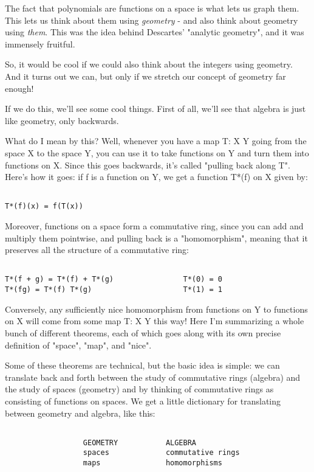 The fact that polynomials are functions on a space is what lets us 
graph them.  This lets us think about them using \emph{geometry} - and also 
think about geometry using \emph{them}.  This was the idea behind Descartes'
"analytic geometry", and it was immensely fruitful.

So, it would be cool if we could also think about the integers using 
geometry.  And it turns out we can, but only if we stretch our concept 
of geometry far enough!  

If we do this, we'll see some cool things.  First of all, we'll see 
that algebra is just like geometry, only backwards.  

What do I mean by this?  Well, whenever you have a map T: X \to  Y going 
from the space X to the space Y, you can use it to take functions on Y 
and turn them into functions on X.  Since this goes backwards, it's 
called "pulling back along T".  Here's how it goes: if f is a function 
on Y, we get a function T*(f) on X given by:


\begin{verbatim}

T*(f)(x) = f(T(x))
\end{verbatim}
    

Moreover, functions on a space form a commutative ring, since you can 
add and multiply them pointwise, and pulling back is a "homomorphism", 
meaning that it preserves all the structure of a commutative ring:


\begin{verbatim}

T*(f + g) = T*(f) + T*(g)                T*(0) = 0
T*(fg) = T*(f) T*(g)                     T*(1) = 1
\end{verbatim}
    

Conversely, any sufficiently nice homomorphism from functions on Y to 
functions on X will come from some map T: X \to  Y this way!  Here I'm
summarizing a whole bunch of different theorems, each of which goes 
along with its own precise definition of "space", "map", and "nice".  

Some of these theorems are technical, but the basic idea is simple: 
we can translate back and forth between the study of commutative rings 
(algebra) and the study of spaces (geometry) and by thinking of 
commutative rings as consisting of functions on spaces.  We get a little 
dictionary for translating between geometry and algebra, like this:


\begin{verbatim}

                  GEOMETRY           ALGEBRA
                  spaces             commutative rings
                  maps               homomorphisms
\end{verbatim}
    
